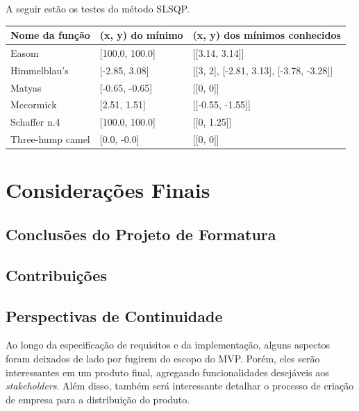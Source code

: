 \documentclass[]{politex}
\begin{document}
A seguir estão os testes do método SLSQP.
\begin{table}[H]
\begin{tabular}{l|l|l}
 Nome da função & (x, y) do mínimo & (x, y) dos mínimos conhecidos \\ \hline
 \rowcolor{Gray}
 Easom & [100.0, 100.0] & [[3.14, 3.14]] \\
 \rowcolor{Gray}
 Himmelblau's & [-2.85, 3.08] & [[3, 2], [-2.81, 3.13], [-3.78, -3.28]] \\
 \rowcolor{Gray}
 Matyas & [-0.65, -0.65] & [[0, 0]] \\
 \rowcolor{Gray}
 Mccormick & [2.51, 1.51] & [[-0.55, -1.55]] \\
 \rowcolor{Gray}
 Schaffer n.4 & [100.0, 100.0] & [[0, 1.25]] \\
 Three-hump camel & [0.0, -0.0] & [[0, 0]]
\end{tabular}
\end{table}



\chapter{Considerações Finais}


\section{Conclusões do Projeto de Formatura}


\section{Contribuições}


\section{Perspectivas de Continuidade}

Ao longo da especificação de requisitos e da implementação, alguns aspectos
foram deixados de lado por fugirem do escopo do MVP. Porém, eles serão
interessantes em um produto final, agregando funcionalidades desejáveis aos
\textit{stakeholders}. Além disso, também será interessante detalhar o processo de
criação de empresa para a distribuição do produto.
\end{document}

